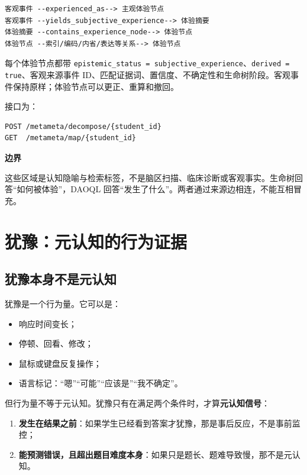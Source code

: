 \documentclass[UTF8,a4paper,11pt]{ctexart}
\newenvironment{explainbox}[1]
{\begin{center}\begin{minipage}{0.94\textwidth}\colorbox{boxbg}{\parbox{0.92\textwidth}{\textbf{#1}\par\vspace{2pt}}}}
{\end{minipage}\end{center}}
\begin{document}
\begin{verbatim}
客观事件 --experienced_as--> 主观体验节点
客观事件 --yields_subjective_experience--> 体验摘要
体验摘要 --contains_experience_node--> 体验节点
体验节点 --索引/编码/内省/表达等关系--> 体验节点
\end{verbatim}

每个体验节点都带 \texttt{epistemic\_status = subjective\_experience}、\texttt{derived = true}、客观来源事件 ID、匹配证据词、置信度、不确定性和生命树阶段。客观事件保持原样；体验节点可以更正、重算和撤回。

接口为：

\begin{verbatim}
POST /metameta/decompose/{student_id}
GET  /metameta/map/{student_id}
\end{verbatim}

\begin{explainbox}{边界}
这些区域是认知隐喻与检索标签，不是脑区扫描、临床诊断或客观事实。生命树回答“如何被体验”，DAOQL 回答“发生了什么”。两者通过来源边相连，不能互相冒充。
\end{explainbox}

\newpage

\section{犹豫：元认知的行为证据}

\subsection{犹豫本身不是元认知}

犹豫是一个行为量。它可以是：

\begin{itemize}[leftmargin=2em]
\item 响应时间变长；
\item 停顿、回看、修改；
\item 鼠标或键盘反复操作；
\item 语言标记：“嗯”“可能”“应该是”“我不确定”。
\end{itemize}

但行为量不等于元认知。犹豫只有在满足两个条件时，才算\textbf{元认知信号}：

\begin{enumerate}[leftmargin=2em]
\item \textbf{发生在结果之前}：如果学生已经看到答案才犹豫，那是事后反应，不是事前监控；
\item \textbf{能预测错误，且超出题目难度本身}：如果只是题长、题难导致慢，那不是元认知。
\end{enumerate}
\end{document}
